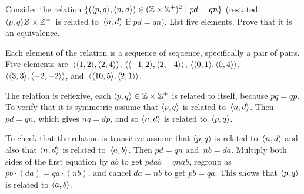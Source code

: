 \documentclass{ibl}  %
\begin{document}
\begin{problem}[\maxlength] \label{RationalsAsEqClasses}
Consider the relation
$\{(\langle p,q\rangle,\langle n,d\rangle)\in (\mathbb{Z}\times\mathbb{Z}^+)^2 \bigm| pd=qn\}$
(restated, $\langle p,q\rangle\\Z\times\mathbb{Z}^+$\ is related to~$\langle n,d\rangle$
if $pd=qn$).
List five elements.
Prove that it is an equivalence.
\begin{answer}
Each element of the relation is a sequence of sequence, specifically a
pair of pairs.
Five elements are~$\langle\langle1,2\rangle,\langle2,4\rangle\rangle$, 
$\langle\langle-1,2\rangle,\langle2,-4\rangle\rangle$,  
$\langle\langle0,1\rangle,\langle0,4\rangle\rangle$,  
$\langle\langle3,3\rangle,\langle-2,-2\rangle\rangle$,  
and~$\langle\langle10,5\rangle,\langle2,1\rangle\rangle$.

The relation is reflexive, each $\langle p,q\rangle\in\mathbb{Z}\times\mathbb{Z}^+$ is 
related to itself, because $pq=qp$. 
To verify that it is symmetric assume that 
$\langle p,q\rangle$ is related to~$\langle n,d\rangle$.
Then $pd=qn$, which gives $nq=dp$,
and so $\langle n,d\rangle$ is related to~$\langle p,q\rangle$.

To check that the relation is transitive assume that 
$\langle p,q\rangle$ is related to~$\langle n,d\rangle$
and also that $\langle n,d\rangle$ is related to~$\langle a,b\rangle$.
Then $pd=qn$ and~$nb=da$.
Multiply both sides of the first equation by $ab$ to get $pdab=qnab$, regroup as
$pb\cdot(da)=qa\cdot(nb)$, and cancel $da=nb$ to get $pb=qa$.
This shows that $\langle p,q\rangle$ is related to $\langle a,b\rangle$.  
\end{answer}
\end{problem}

\end{document}
